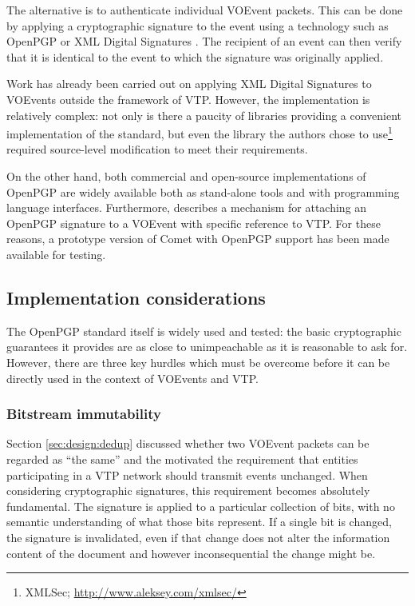 \documentclass[5p,authoryear]{elsarticle}
\begin{document}
The alternative is to authenticate individual VOEvent packets. This can be
done by applying a cryptographic signature to the event using a technology
such as OpenPGP \citep{Callas:2007} or XML Digital Signatures
\citep{Bartel:2008}. The recipient of an event can then verify that it is
identical to the event to which the signature was originally applied.

Work has already been carried out on applying XML Digital Signatures to
VOEvents \citep{Allen:2008} outside the framework of VTP\@. However, the
implementation is relatively complex: not only is there a paucity of libraries
providing a convenient implementation of the standard, but even the library
the authors chose to use\footnote{XMLSec;
\url{http://www.aleksey.com/xmlsec/}} required source-level modification to
meet their requirements.

On the other hand, both commercial and open-source implementations of OpenPGP
are widely available both as stand-alone tools and with programming language
interfaces. Furthermore, \citet{Denny:2008} describes a mechanism for
attaching an OpenPGP signature to a VOEvent with specific reference to VTP\@.
For these reasons, a prototype version of Comet with OpenPGP support has been
made available for testing.

\subsection{Implementation considerations}

The OpenPGP standard itself is widely used and tested: the basic cryptographic
guarantees it provides are as close to unimpeachable as it is reasonable to
ask for. However, there are three key hurdles which must be overcome before it
can be directly used in the context of VOEvents and VTP.

\subsubsection{Bitstream immutability}

Section \ref{sec:design:dedup} discussed whether two VOEvent packets can be
regarded as ``the same'' and the motivated the requirement that entities
participating in a VTP network should transmit events unchanged. When
considering cryptographic signatures, this requirement becomes absolutely
fundamental. The signature is applied to a particular collection of bits, with
no semantic understanding of what those bits represent. If a single bit is
changed, the signature is invalidated, even if that change does not alter the
information content of the document and however inconsequential the change
might be.
\end{document}
